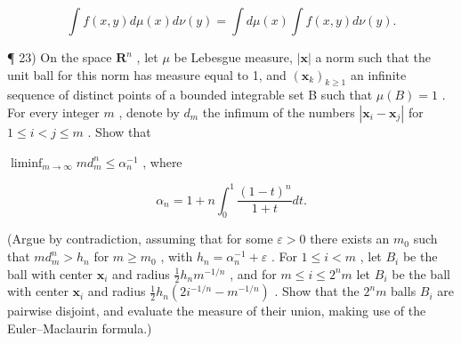 \[
\int f (x, y) d \mu (x) d \nu (y) = \int d \mu (x) \int f (x, y) d \nu (y).
\]

¶ 23) On the space \(\mathbf{R}^n\) , let \(\mu\) be Lebesgue measure, \(|\mathbf{x}|\) a norm such that the unit ball for this norm has measure equal to 1, and \((\mathbf{x}_k)_{k \geqslant 1}\) an infinite sequence of distinct points of a bounded integrable set B such that \(\mu(B) = 1\) . For every integer \(m\) , denote by \(d_m\) the infimum of the numbers \(|\mathbf{x}_i - \mathbf{x}_j|\) for \(1 \leqslant i < j \leqslant m\) . Show that

\(\liminf_{m \to \infty} md_m^n \leqslant \alpha_n^{-1}\) , where

\[
\alpha_ {n} = 1 + n \int_ {0} ^ {1} \frac {(1 - t) ^ {n}}{1 + t} d t.
\]

(Argue by contradiction, assuming that for some \(\varepsilon > 0\) there exists an \(m_0\) such that \(md_m^n > h_n\) for \(m \geqslant m_0\) , with \(h_n = \alpha_n^{-1} + \varepsilon\) . For \(1 \leqslant i < m\) , let \(B_i\) be the ball with center \(\mathbf{x}_i\) and radius \(\frac{1}{2} h_n m^{-1/n}\) , and for \(m \leqslant i \leqslant 2^n m\) let \(B_i\) be the ball with center \(\mathbf{x}_i\) and radius \(\frac{1}{2} h_n (2i^{-1/n} - m^{-1/n})\) . Show that the \(2^n m\) balls \(B_i\) are pairwise disjoint, and evaluate the measure of their union, making use of the Euler--Maclaurin formula.)
\relax{}
\setcounter{exercisegroup}{5}
\edef\CurrentExerciseGroup{\arabic{exercisegroup}}
